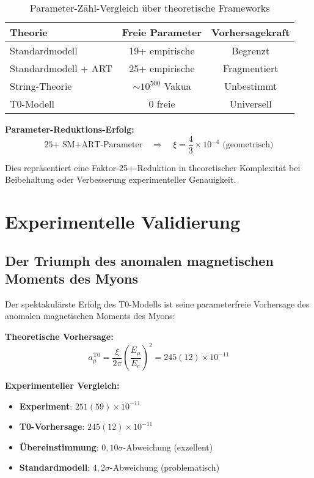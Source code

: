 \documentclass[12pt,a4paper]{report}
\begin{document}
	\begin{table}[htbp]
		\centering
		\begin{tabular}{lcc}
			\toprule
			\textbf{Theorie} & \textbf{Freie Parameter} & \textbf{Vorhersagekraft} \\
			\midrule
			Standardmodell & 19+ empirische & Begrenzt \\
			Standardmodell + ART & 25+ empirische & Fragmentiert \\
			String-Theorie & $\sim 10^{500}$ Vakua & Unbestimmt \\
			T0-Modell & 0 freie & Universell \\
			\bottomrule
		\end{tabular}
		\caption{Parameter-Zähl-Vergleich über theoretische Frameworks}
		\label{tab:parameter_comparison}
	\end{table}
	
	\textbf{Parameter-Reduktions-Erfolg:}
	\begin{equation}
		\text{25+ SM+ART-Parameter} \quad \Rightarrow \quad \xi = \frac{4}{3} \times 10^{-4} \text{ (geometrisch)}
	\end{equation}
	
	Dies repräsentiert eine Faktor-25+-Reduktion in theoretischer Komplexität bei Beibehaltung oder Verbesserung experimenteller Genauigkeit.
	
	\section{Experimentelle Validierung}
	\label{sec:experimental_validation}
	
	\subsection{Der Triumph des anomalen magnetischen Moments des Myons}
	\label{subsec:muon_triumph}
	
	Der spektakulärste Erfolg des T0-Modells ist seine parameterfreie Vorhersage des anomalen magnetischen Moments des Myons:
	
	\textbf{Theoretische Vorhersage:}
	\begin{equation}
		a_\mu^{\text{T0}} = \frac{\xi}{2\pi} \left(\frac{E_\mu}{E_e}\right)^2 = 245(12) \times 10^{-11}
	\end{equation}
	
	\textbf{Experimenteller Vergleich:}
	\begin{itemize}
		\item \textbf{Experiment}: $251(59) \times 10^{-11}$
		\item \textbf{T0-Vorhersage}: $245(12) \times 10^{-11}$
		\item \textbf{Übereinstimmung}: $0,10\sigma$-Abweichung (exzellent)
		\item \textbf{Standardmodell}: $4,2\sigma$-Abweichung (problematisch)
	\end{itemize}
	
\end{document}
